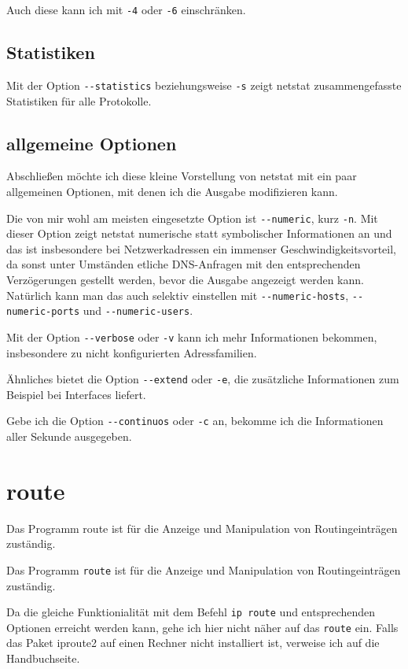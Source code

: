 \begin{normaltext}
  Auch diese kann ich mit \verb?-4? oder \verb?-6? einschränken.

  \subsection*{Statistiken}
  \label{sec:netz-werkzeuge-netstat-statistics}

  Mit der Option \verb?--statistics? beziehungsweise \verb?-s? zeigt netstat
  zusammengefasste Statistiken für alle Protokolle.

  \subsection*{allgemeine Optionen}
  \label{sec:netz-werkzeuge-netstat-allgemein}

  Abschließen möchte ich diese kleine Vorstellung von netstat mit ein paar
  allgemeinen Optionen, mit denen ich die Ausgabe modifizieren kann.

  Die von mir wohl am meisten eingesetzte Option ist \verb?--numeric?, kurz
  \verb?-n?. Mit dieser Option zeigt netstat numerische statt symbolischer
  Informationen an und das ist insbesondere bei Netzwerkadressen ein immenser
  Geschwindigkeitsvorteil, da sonst unter Umständen etliche DNS-Anfragen mit
  den entsprechenden Verzögerungen gestellt werden, bevor die Ausgabe
  angezeigt werden kann. Natürlich kann man das auch selektiv einstellen mit
  \verb?--numeric-hosts?, \verb?--numeric-ports? und \verb?--numeric-users?.

  Mit der Option \verb?--verbose? oder \verb?-v? kann ich mehr Informationen
  bekommen, insbesondere zu nicht konfigurierten Adressfamilien.

  Ähnliches bietet die Option \verb?--extend? oder \verb?-e?, die zusätzliche
  Informationen zum Beispiel bei Interfaces liefert.

  Gebe ich die Option \verb?--continuos? oder \verb?-c? an, bekomme ich die
  Informationen aller Sekunde ausgegeben.
\end{normaltext}


\section{route}
\label{sec:netz-werkzeuge-route}
\begin{abstractsec}
  Das Programm route ist für die Anzeige und Manipulation von Routingeinträgen
  zuständig.
\end{abstractsec}
\begin{normaltext}
  Das Programm \verb?route? ist für die Anzeige und Manipulation von
  Routingeinträgen zuständig.
  
  Da die gleiche Funktionialität mit dem Befehl \verb?ip route? und
  entsprechenden Optionen erreicht werden kann, gehe ich hier nicht näher auf
  das \verb?route? ein. Falls das Paket iproute2 auf einen Rechner nicht
  installiert ist, verweise ich auf die Handbuchseite.
\end{normaltext}

